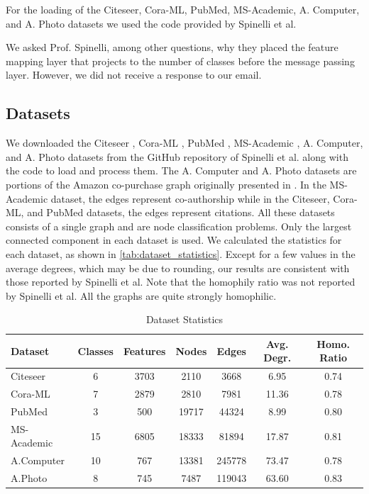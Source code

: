 \documentclass{gdl}
\begin{document}
For the loading of the Citeseer, Cora-ML, PubMed, MS-Academic, A. Computer, and A. Photo datasets we used the code provided by Spinelli et al.

We asked Prof. Spinelli, among other questions, why they placed the feature mapping layer that projects to the number of classes before the message passing layer. However, we did not receive a response to our email.

\subsection{Datasets}
We downloaded the Citeseer \cite{sen2008}, Cora-ML \cite{mccallum2000}, PubMed \cite{namata2012}, MS-Academic \cite{shchur2018}, A. Computer, and A. Photo datasets from the GitHub repository of Spinelli et al. along with the code to load and process them. The A. Computer and A. Photo datasets are portions of the Amazon co-purchase graph originally presented in \cite{mcauley2015}. In the MS-Academic dataset, the edges represent co-authorship while in the Citeseer, Cora-ML, and PubMed datasets, the edges represent citations. All these datasets consists of a single graph and are node classification problems. Only the largest connected component in each dataset is used. We calculated the statistics for each dataset, as shown in \autoref{tab:dataset_statistics}. Except for a few values in the average degrees, which may be due to rounding, our results are consistent with those reported by Spinelli et al. Note that the homophily ratio was not reported by Spinelli et al. All the graphs are quite strongly homophilic.

\begin{table}[h]
    \footnotesize\sf
    \setlength{\tabcolsep}{1pt}
    \caption{Dataset Statistics}
    \begin{tabular}{l c c c c c c}
        \toprule
        Dataset & Classes & Features & Nodes & Edges & Avg. Degr. & Homo. Ratio \\
        \midrule
        Citeseer & 6 & 3703 & 2110 & 3668 & 6.95 & 0.74 \\
        Cora-ML & 7 & 2879 & 2810 & 7981 & 11.36 & 0.78 \\
        PubMed & 3 & 500 & 19717 &44324 &8.99 & 0.80 \\
        MS-Academic & 15&6805 & 18333 & 81894 & 17.87 & 0.81 \\
        A.Computer & 10 & 767 & 13381 & 245778 & 73.47 & 0.78 \\
        A.Photo  & 8 & 745 & 7487 & 119043 & 63.60 & 0.83 \\
        \bottomrule
    \end{tabular}
    \label{tab:dataset_statistics}
\end{table}
\end{document}
